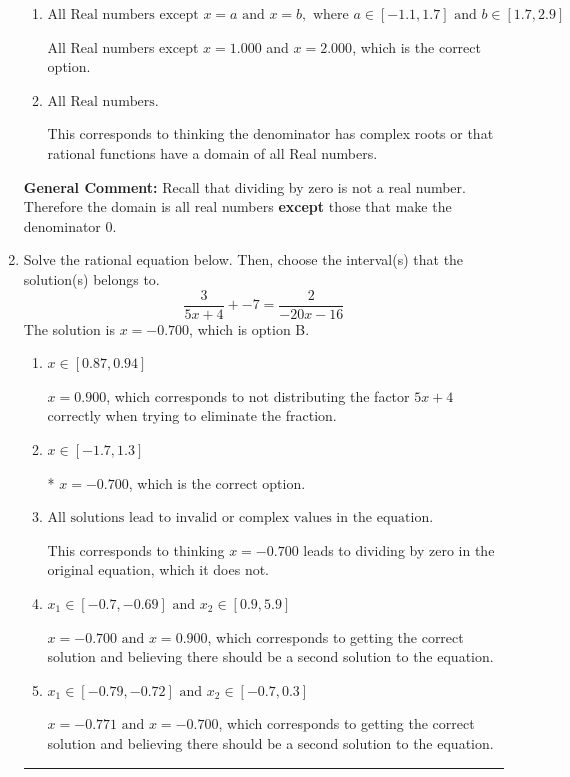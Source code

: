 \documentclass{extbook}[14pt]
\newcommand{\litem}[1]{\item #1

\rule{\textwidth}{0.4pt}}
\begin{document}
\begin{enumerate}
{\begin{enumerate}[label=\Alph*.]
All Real numbers except $x = 16.000$, which corresponds to removing a distractor value from the denominator.
\item \( \text{All Real numbers except } x = a \text{ and } x = b, \text{ where } a \in [-1.1, 1.7] \text{ and } b \in [1.7, 2.9] \)

All Real numbers except $x = 1.000$ and $x = 2.000$, which is the correct option.
\item \( \text{All Real numbers.} \)

This corresponds to thinking the denominator has complex roots or that rational functions have a domain of all Real numbers.
\end{enumerate}

\textbf{General Comment:} Recall that dividing by zero is not a real number. Therefore the domain is all real numbers \textbf{except} those that make the denominator 0.
}
\litem{
Solve the rational equation below. Then, choose the interval(s) that the solution(s) belongs to.
\[ \frac{3}{5x + 4} + -7 = \frac{2}{-20x -16} \]The solution is \( x = -0.700 \), which is option B.\begin{enumerate}[label=\Alph*.]
\item \( x \in [0.87,0.94] \)

$x = 0.900$, which corresponds to not distributing the factor $5x + 4$ correctly when trying to eliminate the fraction.
\item \( x \in [-1.7,1.3] \)

* $x = -0.700$, which is the correct option.
\item \( \text{All solutions lead to invalid or complex values in the equation.} \)

This corresponds to thinking $x = -0.700$ leads to dividing by zero in the original equation, which it does not.
\item \( x_1 \in [-0.7, -0.69] \text{ and } x_2 \in [0.9,5.9] \)

$x = -0.700 \text{ and } x = 0.900$, which corresponds to getting the correct solution and believing there should be a second solution to the equation.
\item \( x_1 \in [-0.79, -0.72] \text{ and } x_2 \in [-0.7,0.3] \)

$x = -0.771 \text{ and } x = -0.700$, which corresponds to getting the correct solution and believing there should be a second solution to the equation.
\end{enumerate}

}
\end{enumerate}
\end{document}
